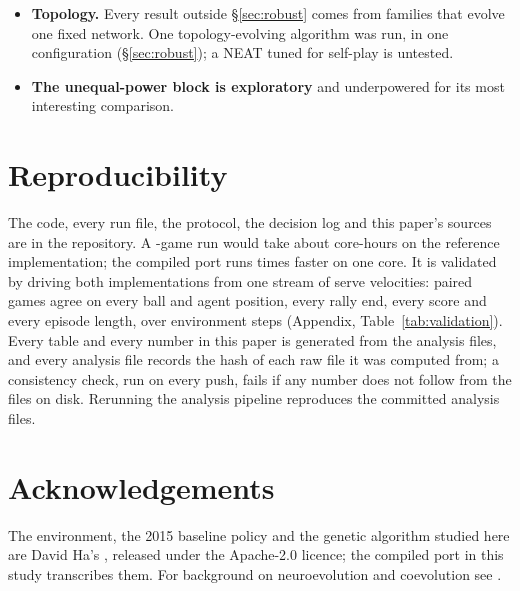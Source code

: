 \documentclass[11pt]{article}
\begin{document}
\begin{itemize}
  design, as a test two (\S\ref{sec:archive}, \S\ref{sec:robust}); a curated
  archive, one that keeps the best occupant of each niche, or one that picks
  opponents by what they teach, is untested. Of
  export rules only the streak rule, a 16-peer tournament and four
  bookkeepings of the streak counter were tested.
\item \textbf{Topology.} Every result outside \S\ref{sec:robust} comes from
  families that evolve one fixed network. One topology-evolving algorithm was run, in one configuration
  (\S\ref{sec:robust}); a NEAT tuned for self-play is untested.
\item \textbf{The unequal-power block is exploratory} and underpowered for its
  most interesting comparison.
\end{itemize}

\section{Reproducibility}
\label{sec:repro}

The code, every run file, the protocol, the decision log and this paper's
sources are in the repository. A \nBudget-game run would take about
\nValRefCoreHours{} core-hours on the reference implementation; the compiled
port runs \nValSpeedup{} times faster on one core. It is validated by driving
both implementations from one stream of serve velocities: \nValGames{} paired
games agree on every ball and agent position, every rally end, every score and
every episode length, over \nValSteps{} environment steps (Appendix,
Table~\ref{tab:validation}). Every table and every number in this paper is
generated from the analysis files, and every analysis file records the hash of
each raw file it was computed from; a consistency check, run on every push,
fails if any number does not follow from the files on disk. Rerunning the
analysis pipeline reproduces the committed analysis files.

\section*{Acknowledgements}
The environment, the 2015 baseline policy and the genetic algorithm studied
here are David Ha's \citep{ha2015slime,ha2020slimevolleygym}, released under
the Apache-2.0 licence; the compiled port in this study transcribes them. For
background on neuroevolution and coevolution see \citet{risi2026neuroevolution}.
\end{document}
